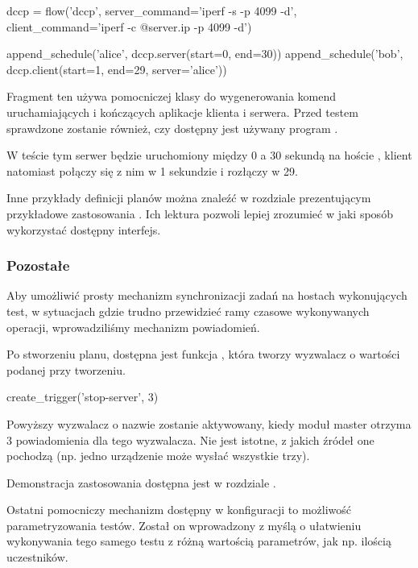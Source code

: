 \documentclass[00-praca-magisterska.tex]{subfiles}
\begin{document}
\begin{pythoncode}
  dccp = flow('dccp',
      server_command='iperf -s -p 4099 -d',
      client_command='iperf -c @{server.ip} -p 4099 -d')

  append_schedule('alice', dccp.server(start=0, end=30))
  append_schedule('bob',   dccp.client(start=1, end=29, server='alice'))
\end{pythoncode}

Fragment ten używa pomocniczej klasy  do wygenerowania komend
uruchamiających i kończących aplikacje klienta i serwera. Przed testem
sprawdzone zostanie również, czy dostępny jest używany program .

W teście tym serwer będzie uruchomiony między 0 a 30 sekundą na
hoście , klient natomiast połączy się z nim w 1 sekundzie i rozłączy
w 29.

Inne przykłady definicji planów można znaleźć w rozdziale prezentującym
przykładowe zastosowania . Ich lektura
pozwoli lepiej zrozumieć w jaki sposób wykorzystać dostępny interfejs.

\subsubsection{Pozostałe}

Aby umożliwić prosty mechanizm synchronizacji zadań na hostach wykonujących
test, w sytuacjach gdzie trudno przewidzieć ramy czasowe wykonywanych operacji,
wprowadziliśmy mechanizm powiadomień.

Po stworzeniu planu, dostępna jest funkcja , która tworzy
wyzwalacz o wartości podanej przy tworzeniu.

\begin{pythoncode}
  create_trigger('stop-server', 3)
\end{pythoncode}

Powyższy wyzwalacz o nazwie  zostanie aktywowany, kiedy moduł
master otrzyma 3 powiadomienia dla tego wyzwalacza. Nie jest istotne, z jakich
źródeł one pochodzą (np. jedno urządzenie może wysłać wszystkie trzy).

Demonstracja zastosowania dostępna jest w rozdziale .

Ostatni pomocniczy mechanizm dostępny w konfiguracji to możliwość
parametryzowania testów. Został on wprowadzony z myślą o ułatwieniu wykonywania
tego samego testu z różną wartością parametrów, jak np. ilością uczestników.
\end{document}
